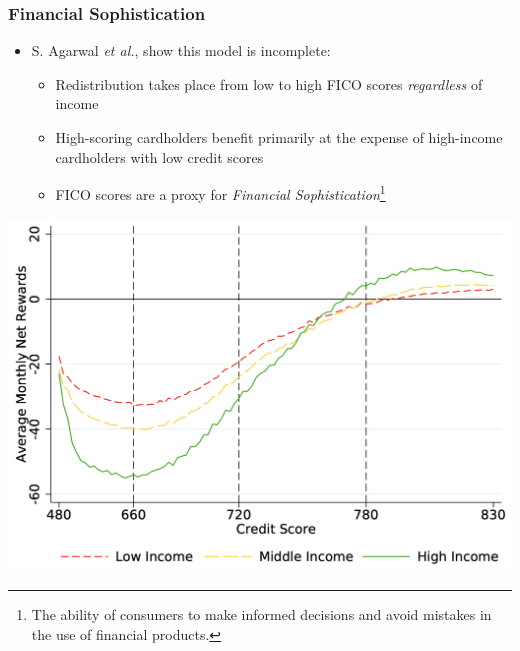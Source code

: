 \begin{frame}
    \frametitle{Financial Sophistication}
    \begin{itemize}
        \item S. Agarwal \emph{et al.}, \citeyearpar{agaretal:2023} show this model is incomplete:
        \begin{itemize}
            \item Redistribution takes place from low to high FICO scores \emph{regardless} of income
            \item High-scoring cardholders benefit primarily at the expense of high-income cardholders with low credit scores
            \item FICO scores are a proxy for \emph{Financial Sophistication}\footnote{The ability of consumers to make informed decisions and avoid mistakes in the use of financial products.}
        \end{itemize}
    \end{itemize}
    \begin{center}
        \includegraphics[width=.6\textwidth]{../Misc/Agarwal_NetRewardsByIncome.png}
    \end{center}    
\end{frame}
    

